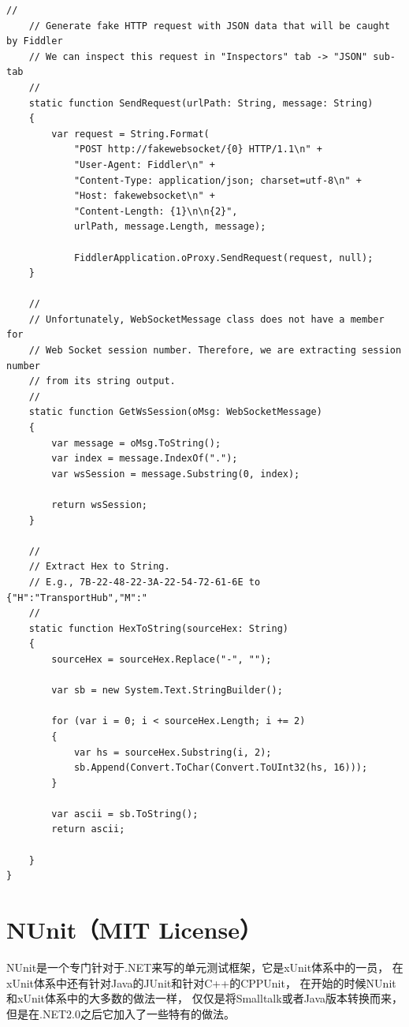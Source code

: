 \documentclass{book}
\begin{document}
\begin{lstlisting}[language={[Sharp]C}]
    //
    // Generate fake HTTP request with JSON data that will be caught by Fiddler
    // We can inspect this request in "Inspectors" tab -> "JSON" sub-tab
    //
    static function SendRequest(urlPath: String, message: String)
    {       
        var request = String.Format(
            "POST http://fakewebsocket/{0} HTTP/1.1\n" +
            "User-Agent: Fiddler\n" +
            "Content-Type: application/json; charset=utf-8\n" +
            "Host: fakewebsocket\n" +
            "Content-Length: {1}\n\n{2}",
            urlPath, message.Length, message);
           
            FiddlerApplication.oProxy.SendRequest(request, null);
    }

    //
    // Unfortunately, WebSocketMessage class does not have a member for 
    // Web Socket session number. Therefore, we are extracting session number
    // from its string output.
    //
    static function GetWsSession(oMsg: WebSocketMessage)
    {
        var message = oMsg.ToString();
        var index = message.IndexOf(".");
        var wsSession = message.Substring(0, index);
       
        return wsSession;
    }
       
    //
    // Extract Hex to String.
    // E.g., 7B-22-48-22-3A-22-54-72-61-6E to {"H":"TransportHub","M":"
    //
    static function HexToString(sourceHex: String)
    {
        sourceHex = sourceHex.Replace("-", "");
       
        var sb = new System.Text.StringBuilder();
       
        for (var i = 0; i < sourceHex.Length; i += 2)
        {
            var hs = sourceHex.Substring(i, 2);
            sb.Append(Convert.ToChar(Convert.ToUInt32(hs, 16)));
        }
       
        var ascii = sb.ToString();
        return ascii;

    }
}
\end{lstlisting}



\section{NUnit（MIT License）}

NUnit是一个专门针对于.NET来写的单元测试框架，它是xUnit体系中的一员，
在xUnit体系中还有针对Java的JUnit和针对C++的CPPUnit，
在开始的时候NUnit和xUnit体系中的大多数的做法一样，
仅仅是将Smalltalk或者Java版本转换而来，但是在.NET2.0之后它加入了一些特有的做法。
\end{document}

